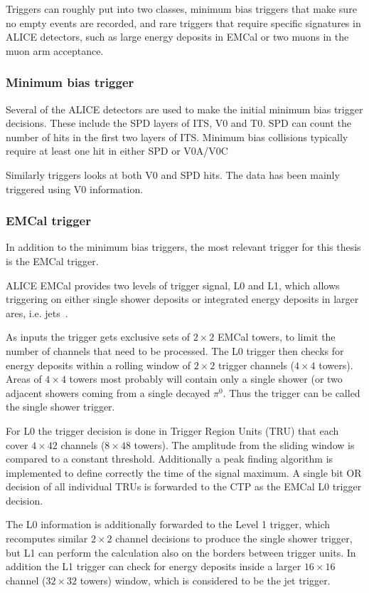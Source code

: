 Triggers can roughly put into two classes, minimum bias triggers that make sure no empty events are recorded, and rare triggers that require specific signatures in ALICE detectors, such as large energy deposits in EMCal or two muons in the muon arm acceptance.

\subsubsection*{Minimum bias trigger}
Several of the ALICE detectors are used to make the initial minimum bias trigger decisions. These include the SPD layers of ITS, V0 and T0. SPD can count the number of hits in the first two layers of ITS. Minimum bias \pp collisions typically require at least one hit in either SPD or V0A/V0C

Similarly \PbPb triggers looks at both V0 and SPD hits. The \pPb data has been mainly triggered using V0 information.


\subsubsection*{EMCal trigger}
In addition to the minimum bias triggers, the most relevant trigger for this thesis is the EMCal trigger. 

ALICE EMCal provides two levels of trigger signal, L0 and L1, which allows triggering on either single shower deposits or integrated energy deposits in larger ares, i.e. jets~\cite{KRAL2012261}.

As inputs the trigger gets exclusive sets of $2\times2$ EMCal towers, to limit the number of channels that need to be processed. The L0 trigger then checks for energy deposits within a rolling window of $2\times2$ trigger channels ($4\times4$ towers). Areas of $4\times4$ towers most probably will contain only a single shower (or two adjacent showers coming from a single decayed $\pi^0$. Thus the trigger can be called the single shower trigger. 

For L0 the trigger decision is done in Trigger Region Units (TRU) that each cover $4\times42$ channels ($8\times48$ towers). The amplitude from the sliding window is compared to a constant threshold. Additionally a peak finding algorithm is implemented to define correctly the time of the signal maximum. A single bit OR decision of all individual TRUs is forwarded to the CTP as the EMCal L0 trigger decision.

The L0 information is additionally forwarded to the Level 1 trigger, which recomputes similar $2\times2$ channel decisions to produce the single shower trigger, but L1 can perform the calculation also on the borders between trigger units. In addition the L1 trigger can  check for energy deposits inside a larger $16\times16$ channel ($32\times32$ towers) window, which is considered to be the jet trigger.

